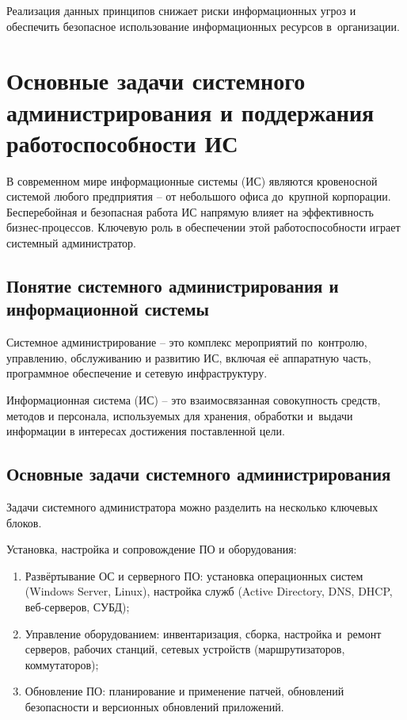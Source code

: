 \documentclass{ou}
\begin{document}
Реализация данных принципов снижает риски информационных угроз и 
обеспечить безопасное использование информационных ресурсов в~организации. 
\newpage
\section{Основные задачи системного администрирования и поддержания работоспособности ИС}
В современном мире информационные системы (ИС) являются кровеносной системой любого предприятия -- от небольшого офиса до~крупной корпорации. Бесперебойная и безопасная работа ИС напрямую влияет на эффективность бизнес-процессов. Ключевую роль в обеспечении этой работоспособности играет системный администратор.
\subsection{Понятие системного администрирования и информационной системы}
Системное администрирование -- это комплекс мероприятий по~контролю, управлению,  обслуживанию и развитию ИС, включая её аппаратную часть, программное обеспечение и сетевую инфраструктуру.

Информационная система (ИС) -- это взаимосвязанная совокупность средств, методов и персонала, используемых для хранения, обработки и~выдачи информации в интересах достижения поставленной цели.
\subsection{Основные задачи системного администрирования}
Задачи системного администратора можно разделить на несколько ключевых блоков.

Установка, настройка и сопровождение ПО и оборудования:
\begin{enumerate}[leftmargin=0em, itemindent=3.75em, nosep, label=\arabic*)]
\item Развёртывание ОС и серверного ПО: установка операционных систем (Windows Server, Linux), настройка служб (Active Directory, DNS, DHCP, веб-серверов, СУБД);
\item Управление оборудованием: инвентаризация, сборка, настройка и~ремонт серверов, рабочих станций, сетевых устройств (маршрутизаторов, коммутаторов);
\item Обновление ПО: планирование и применение патчей, обновлений безопасности и версионных обновлений приложений.
\end{enumerate}
\end{document}
